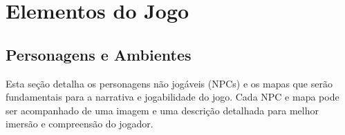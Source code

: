 \section{Elementos do Jogo}

\subsection{Personagens e Ambientes}
Esta seção detalha os personagens não jogáveis (NPCs) e os mapas que serão fundamentais para a narrativa e jogabilidade do jogo. Cada NPC e mapa pode ser acompanhado de uma imagem e uma descrição detalhada para melhor imersão e compreensão do jogador.

